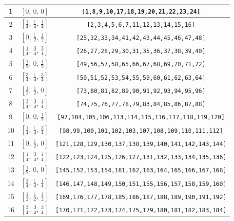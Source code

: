 \documentclass[fleqn,8pt]{jsarticle}
\begin{document}
\begin{longtable}{ccc}
1 & $\left[ 0,\, 0,\, 0 \right]$ & {\tt [1,8,9,10,17,18,19,20,21,22,23,24]} \\ \hline
2 & $\left[ \frac{1}{4},\, \frac{1}{4},\, \frac{1}{4} \right]$ & {\tt [2,3,4,5,6,7,11,12,13,14,15,16]} \\ \hline
3 & $\left[ 0,\, \frac{1}{2},\, \frac{1}{2} \right]$ & {\tt [25,32,33,34,41,42,43,44,45,46,47,48]} \\ \hline
4 & $\left[ \frac{1}{4},\, \frac{3}{4},\, \frac{3}{4} \right]$ & {\tt [26,27,28,29,30,31,35,36,37,38,39,40]} \\ \hline
5 & $\left[ \frac{1}{2},\, 0,\, \frac{1}{2} \right]$ & {\tt [49,56,57,58,65,66,67,68,69,70,71,72]} \\ \hline
6 & $\left[ \frac{3}{4},\, \frac{1}{4},\, \frac{3}{4} \right]$ & {\tt [50,51,52,53,54,55,59,60,61,62,63,64]} \\ \hline
7 & $\left[ \frac{1}{2},\, \frac{1}{2},\, 0 \right]$ & {\tt [73,80,81,82,89,90,91,92,93,94,95,96]} \\ \hline
8 & $\left[ \frac{3}{4},\, \frac{3}{4},\, \frac{1}{4} \right]$ & {\tt [74,75,76,77,78,79,83,84,85,86,87,88]} \\ \hline
9 & $\left[ 0,\, 0,\, \frac{1}{2} \right]$ & {\tt [97,104,105,106,113,114,115,116,117,118,119,120]} \\ \hline
10 & $\left[ \frac{1}{4},\, \frac{1}{4},\, \frac{3}{4} \right]$ & {\tt [98,99,100,101,102,103,107,108,109,110,111,112]} \\ \hline
11 & $\left[ 0,\, \frac{1}{2},\, 0 \right]$ & {\tt [121,128,129,130,137,138,139,140,141,142,143,144]} \\ \hline
12 & $\left[ \frac{1}{4},\, \frac{3}{4},\, \frac{1}{4} \right]$ & {\tt [122,123,124,125,126,127,131,132,133,134,135,136]} \\ \hline
13 & $\left[ \frac{1}{2},\, 0,\, 0 \right]$ & {\tt [145,152,153,154,161,162,163,164,165,166,167,168]} \\ \hline
14 & $\left[ \frac{3}{4},\, \frac{1}{4},\, \frac{1}{4} \right]$ & {\tt [146,147,148,149,150,151,155,156,157,158,159,160]} \\ \hline
15 & $\left[ \frac{1}{2},\, \frac{1}{2},\, \frac{1}{2} \right]$ & {\tt [169,176,177,178,185,186,187,188,189,190,191,192]} \\ \hline
16 & $\left[ \frac{3}{4},\, \frac{3}{4},\, \frac{3}{4} \right]$ & {\tt [170,171,172,173,174,175,179,180,181,182,183,184]} \\
\end{longtable}
\renewcommand{\arraystretch}{1.2}
\end{document}
